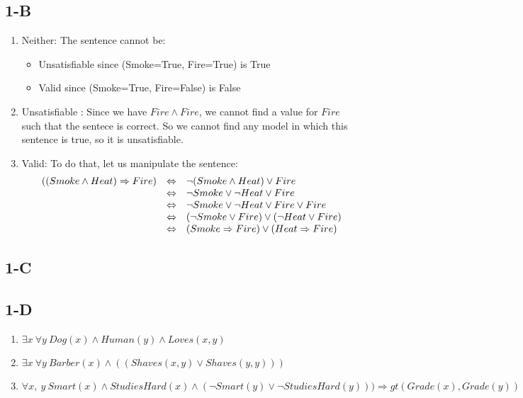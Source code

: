\documentclass{article}
\begin{document}
        \subsection{1-B}
            \begin{enumerate}
                \item Neither: The sentence cannot be:
                    \begin{itemize}
                        \item Unsatisfiable since (Smoke=True, Fire=True) is True
                        \item Valid since (Smoke=True, Fire=False) is False
                    \end{itemize}
                \item Unsatisfiable : Since we have $Fire\land Fire$, we cannot find a value for $Fire$ such that the sentece is correct. So we cannot find any model in which this sentence is true, so it is unsatisfiable.
                \item Valid: To do that, let us manipulate the sentence:\\
                    \[\begin{array}{r c l}
                            ((Smoke\land Heat)\Rightarrow Fire) & \Leftrightarrow & \lnot (Smoke\land Heat)\lor Fire\\
                            &\Leftrightarrow&\lnot Smoke \lor \lnot Heat \lor Fire\\
                            &\Leftrightarrow&\lnot Smoke \lor \lnot Heat \lor Fire \lor Fire\\
                            &\Leftrightarrow&(\lnot Smoke \lor Fire) \lor (\lnot Heat \lor Fire)\\
                            &\Leftrightarrow& (Smoke \Rightarrow Fire)\lor(Heat\Rightarrow Fire)\\
                    \end{array}\]
            \end{enumerate}

        \subsection{1-C}
        \subsection{1-D}
            \begin{enumerate}
                \item $\exists x\:\forall y\: Dog(x)\land Human(y)\land Loves(x, y)$
                \item $\exists x\: \forall y\: Barber(x)\land ((Shaves(x, y) \lor Shaves(y, y)))$
                \item $\forall x,\: y\: Smart(x)\land StudiesHard(x)\land (\lnot Smart(y)\lor \lnot StudiesHard(y))) \Rightarrow  gt(Grade(x), Grade(y))$
            \end{enumerate}
\end{document}
